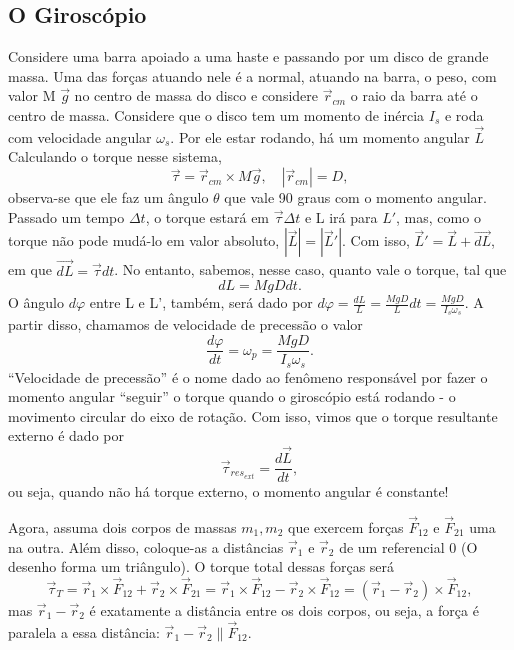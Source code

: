 \documentclass{article}
\begin{document}
\subsection{O Giroscópio}
  Considere uma barra apoiado a uma haste e passando por um disco de grande massa. Uma das forças atuando nele é a normal, atuando na barra, o peso, com valor M \(\vec{g}\) no centro de massa do disco
e considere \(\vec{r}_{cm}\) o raio da barra até o centro de massa. Considere que o disco tem um momento de inércia \(I_{s}\) e roda com velocidade angular \(\omega_{s}\). Por ele estar rodando,
há um momento angular \(\vec{L}\)
Calculando o torque nesse sistema, 
  \[
    \vec{\tau } = \vec{r}_{cm}\times M \vec{g},\quad |\vec{r}_{cm}| = D,
  \]
observa-se que ele faz um ângulo \(\theta\) que vale 90 graus com o momento angular. Passado um tempo \(\Delta t\), o torque estará
em \(\vec{\tau }\Delta t\) e L irá para \(L'\), mas, como o torque não pode mudá-lo em valor absoluto, \(|\vec{L}|=|\vec{L}'|\). Com isso, \(\vec{L}' = \vec{L} + \vec{dL}\),
em que \(\vec{dL} = \vec{\tau} dt\). No entanto, sabemos, nesse caso, quanto vale o torque, tal que 
  \[
    dL = MgDdt.
  \]
  O ângulo \(d\varphi \) entre L e L', também, será dado por \(d\varphi = \frac{dL}{L} = \frac{MgD}{L}dt = \frac{MgD}{I_{s}\omega_{s}}.\) A partir disso,
chamamos de velocidade de precessão o valor 
  \[
    \frac{d\varphi }{dt}= \omega_{p} = \frac{MgD}{I_{s}\omega_{s}}.
  \]
  ``Velocidade de precessão'' é o nome dado ao fenômeno responsável por fazer o momento angular ``seguir'' o torque quando o giroscópio está rodando - o movimento circular do eixo de rotação. Com isso,
vimos que o torque resultante externo é dado por 
  \[
    \vec{\tau }_{res_{ext}} = \frac{d \vec{L}}{dt},
  \]
  ou seja, quando não há torque externo, o momento angular é constante!

  Agora, assuma dois corpos de massas \(m_{1}, m_{2}\) que exercem forças \(\vec{F}_{12}\) e \(\vec{F}_{21}\) uma na outra. Além disso, coloque-as
a distâncias \(\vec{r}_{1}\) e \(\vec{r}_{2}\) de um referencial 0 (O desenho forma um triângulo). O torque total dessas forças será 
  \[
    \vec{\tau}_{T} = \vec{r}_{1}\times \vec{F}_{12} + \vec{r}_{2}\times \vec{F}_{21} = \vec{r}_{1}\times \vec{F}_{12}- \vec{r}_{2}\times \vec{F}_{12} = (\vec{r}_{1}-\vec{r}_{2})\times \vec{F}_{12},
  \]
  mas \(\vec{r}_{1}-\vec{r}_{2}\) é exatamente a distância entre os dois corpos, ou seja, a força é paralela a essa distância: \(\vec{r}_{1}-\vec{r}_{2}\parallel \vec{F}_{12}.\) 
  
\end{document}
